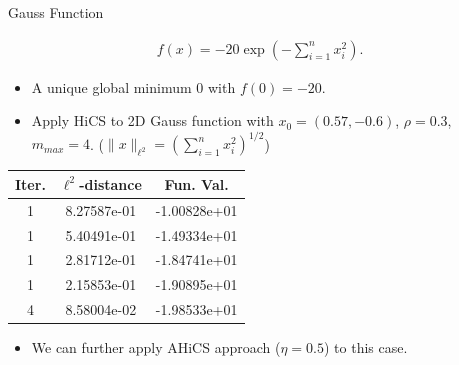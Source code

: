 \documentclass{beamer}
\newcommand{\bmx}{x}
\begin{document}
\begin{frame}{Gauss Function}
\footnotesize{
\begin{align*}
	f(\bmx) = -20 \exp\left( -\sum_{i=1}^n x_i^2 \right).
\end{align*}
\begin{itemize}
	\item A unique global minimum $0$ with $f(0)=-20$.
\end{itemize}
}
\pause
\footnotesize{
	\begin{itemize}
		\item Apply HiCS to 2D Gauss function with $x_0 = (0.57, -0.6)$,
			$\rho=0.3$, $m_{max}=4$. ($\|x\|_{\ell^2}=(\sum_{i=1}^n x_i^2)^{1/2}$)
\end{itemize}
}
\vspace{-0.2cm}
\begin{table}[!htbp]
\begin{center}
\footnotesize{
\begin{tabular}{|c|c|c|}
 \hline
 Iter. & $\ell^2$-distance  &  Fun. Val.
 \\\hline
  1 & 8.27587e-01 & -1.00828e+01
 \\ \hline                                                                                                                                       
  1 & 5.40491e-01 & -1.49334e+01
  \\ \hline  
  1 & 2.81712e-01 & -1.84741e+01  
    \\ \hline  
  1 & 2.15853e-01 & -1.90895e+01  
    \\ \hline  
  4 & 8.58004e-02 & -1.98533e+01  
 \\\hline
\end{tabular}
}
\end{center}
\end{table}
\vspace{-0.3cm}
\pause
\footnotesize{
	\begin{itemize}
		\item We can further apply AHiCS approach ($\eta=0.5$) to this case.
	\end{itemize}
\vspace{-0.1cm}
}
\end{frame}
\end{document}
